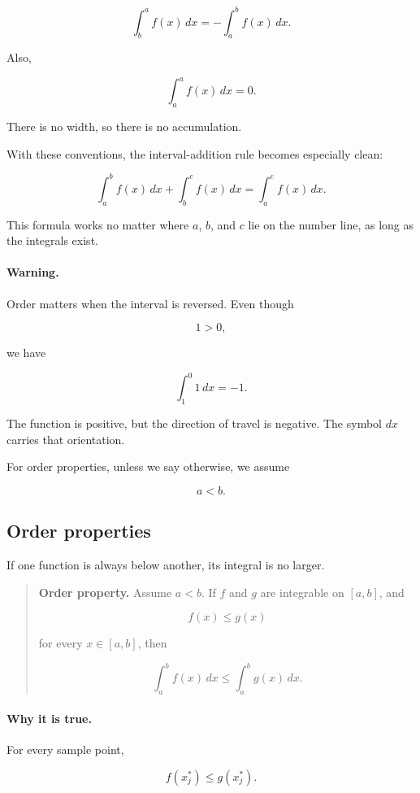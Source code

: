 \[
\boxed{
\int_b^a f(x)\,dx=-\int_a^b f(x)\,dx.
}
\]

Also,

\[
\boxed{
\int_a^a f(x)\,dx=0.
}
\]

There is no width, so there is no accumulation.

With these conventions, the interval-addition rule becomes especially clean:

\[
\boxed{
\int_a^b f(x)\,dx+\int_b^c f(x)\,dx=\int_a^c f(x)\,dx.
}
\]

This formula works no matter where \(a\), \(b\), and \(c\) lie on the number line, as long
as the integrals exist.

\paragraph{Warning.}
Order matters when the interval is reversed.  Even though

\[
1>0,
\]

we have

\[
\int_1^0 1\,dx=-1.
\]

The function is positive, but the direction of travel is negative.  The symbol \(dx\) carries
that orientation.

For order properties, unless we say otherwise, we assume

\[
a<b.
\]

\subsection{Order properties}
\label{subsec:integral-order-properties}

If one function is always below another, its integral is no larger.

\begin{quote}
\textbf{Order property.}
Assume \(a<b\).  If \(f\) and \(g\) are integrable on \([a,b]\), and

\[
f(x)\le g(x)
\]

for every \(x\in[a,b]\), then

\[
\boxed{
\int_a^b f(x)\,dx
\le
\int_a^b g(x)\,dx.
}
\]
\end{quote}

\paragraph{Why it is true.}
For every sample point,

\[
f(x_j^*)\le g(x_j^*).
\]

